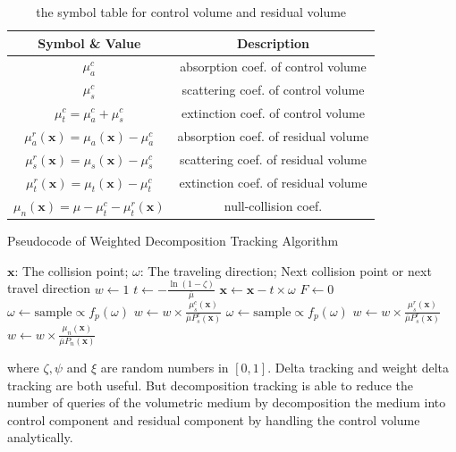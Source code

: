 \documentclass[acmtog]{acmart}
\begin{document}
\begin{table}[htbp]
	\begin{tabular}{c|c}
	\hline
	\textbf{Symbol \& Value}                          & {Description}                               \\ \hline
	$\mu_a^c$                                         & {absorption coef. of control volume}  \\
	$\mu_s^c$                                         & {scattering coef. of control volume}  \\
	$\mu_t^c=\mu_a^c+\mu_s^c$                         & {extinction coef. of control volume}  \\
	$\mu_a^r(\mathbf x)=\mu_a(\mathbf x)-\mu_a^c$     & {absorption coef. of residual volume} \\
	$\mu_s^r(\mathbf x)=\mu_s(\mathbf x)-\mu_s^c$     & {scattering coef. of residual volume} \\
	$\mu_t^r(\mathbf x)=\mu_t(\mathbf x)-\mu_t^c$     & {extinction coef. of residual volume} \\
	$\mu_n(\mathbf x)=\mu-\mu_t^c-\mu_t^r(\mathbf x)$ & {null-collision coef.}                \\ \hline
	\end{tabular}
	\caption{the symbol table for control volume and residual volume}
\end{table}
\begin{algorithm}[H]
	\caption{Pseudocode of Weighted Decomposition Tracking Algorithm}
	\label{weighted_decomposition_tracking_algorithm}
	\begin{algorithmic}[1]
		\Require
		$\mathbf x$: The collision point; $\omega$: The traveling direction;
		\Ensure
		Next collision point or next travel direction
		\State $w\gets1$
		\State $t\gets-\frac{\ln(1-\zeta)}{\bar\mu}$
		\State $\mathbf x\gets\mathbf x-t\times\omega$
		\State $F\gets0$
		\State {}
		\State $\omega\gets\mathrm{sample}\propto f_p(\omega)$
		\State $w\gets w\times \frac{\mu_s^c(\mathbf x)}{\bar\mu P_s^c(\mathbf x)}$
		\State {}
		\State $\omega\gets\mathrm{sample}\propto f_p(\omega)$
		\State $w\gets w\times \frac{\mu_s^r(\mathbf x)}{\bar\mu P_s^r(\mathbf x)}$
		\Else{}
		\State $w\gets w\times \frac{\mu_n(\mathbf x)}{\bar\mu P_n(\mathbf x)}$
		\EndIf
		\EndWhile
	\end{algorithmic}
\end{algorithm}
where $\zeta,\psi$ and $\xi$ are random numbers in $[0,1]$.
Delta tracking and weight delta tracking are both useful.
But decomposition tracking is able to reduce the number of queries of the volumetric medium by decomposition the medium into control component and residual component by handling the control volume analytically.
\end{document}

